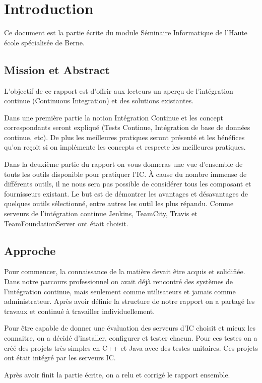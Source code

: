 \chapter{Introduction}
\label{chap:introduction}
Ce document est la partie écrite du module Séminaire Informatique de l'Haute école spécialisée de Berne.

\section{Mission et Abstract}
\label{sec:intro_mission}
L'objectif de ce rapport est d'offrir aux lecteurs un aperçu de l'intégration continue (Continuous Integration) et des solutions existantes.

Dans une première partie la notion Intégration Continue et les concept correspondants seront expliqué (Tests Continue, Intégration de base de données continue, etc). De plus les meilleures pratiques seront présenté et les bénéfices qu'on reçoit si on implémente les concepts et respecte les meilleures pratiques.

Dans la deuxième partie du rapport on vous donneras une vue d'ensemble de touts les outils disponible pour pratiquer l'IC. À cause du nombre immense de différents outils, il ne nous sera pas possible de considérer tous les composant et fournisseurs existant. Le but est de démontrer les avantages et désavantages de quelques outils sélectionné, entre autres les outil les plus répandu. Comme serveurs de l'intégration continue Jenkins, TeamCity, Travis et TeamFoundationServer ont était choisit.

\section{Approche}
\label{sec:intro_approche}

Pour commencer, la connaissance de la matière devait être acquis et solidifiée. Dans notre parcours professionnel on avait déjà rencontré des systèmes de l'intégration continue, mais seulement comme utilisateurs et jamais comme administrateur. Après avoir définie la structure de notre rapport on a partagé les travaux et continué à travailler individuellement. 

Pour être capable de donner une évaluation des serveurs d'IC choisit et mieux les connaitre, on a décidé d'installer, configurer et tester chacun. Pour ces testes on a créé des projets très simples en C++ et Java avec des testes unitaires. Ces projets ont était intégré par les serveurs IC.

Après avoir finit la partie écrite, on a relu et corrigé le rapport ensemble.


